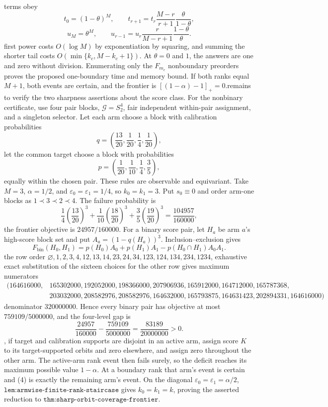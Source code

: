 terms obey\n\[t_0=(1-\theta)^M,\qquad t_{r+1}=t_r\frac{M-r}{r+1}\frac{\theta}{1-\theta},\tag{5}\]\n\[u_M=\theta^M,\qquad u_{r-1}=u_r\frac r{M-r+1}\frac{1-\theta}{\theta}.\tag{6}\]\nThe first power costs \(O(\log M)\) by exponentiation by squaring, and summing the shorter tail costs \(O(\min\{k_c,M-k_c+1\})\). At \(\theta=0\) and \(1\), the answers are one and zero without division. Enumerating only the \(F_{m_c}\) nonboundary preorders proves the proposed one-boundary time and memory bound. If both ranks equal \(M+1\), both events are certain, and the frontier is \([(1-\alpha)-1]_+=0\).\n\nIt remains to verify the two sharpness assertions about the score class. For the nonbinary certificate, use four pair blocks, \(\mathcal G=S_2^4\), fair independent within-pair assignment, and a singleton selector. Let each arm choose a block with calibration probabilities\n\[q=\left(\frac{13}{20},\frac1{20},\frac14,\frac1{20}\right),\]\nand let the common target choose a block with probabilities\n\[p=\left(\frac1{20},\frac1{10},\frac14,\frac35\right),\]\nsplitting equally within the chosen pair. These rules are observable and equivariant. Take \(M=3\), \(\alpha=1/2\), and \(\varepsilon_0=\varepsilon_1=1/4\), so \(k_0=k_1=3\). Put \(s_0\equiv0\) and order arm-one blocks as \(1\prec3\prec2\prec4\). The failure probability is\n\[\frac14\left(\frac{13}{20}\right)^3+\frac1{10}\left(\frac{18}{20}\right)^3+\frac35\left(\frac{19}{20}\right)^3=\frac{104957}{160000},\]\nso the frontier objective is \(24957/160000\). For a binary score pair, let \(H_a\) be arm \(a\)'s high-score block set and put \(A_a=(1-q(H_a))^3\). Inclusion--exclusion gives\n\[F_{\mathrm{bin}}(H_0,H_1)=p(H_0)A_0+p(H_1)A_1-p(H_0\cap H_1)A_0A_1.\tag{7}\]\nIn the row order \(\varnothing,1,2,3,4,12,13,14,23,24,34,123,124,134,234,1234\), exhaustive exact substitution of the sixteen choices for the other row gives maximum numerators\n\[\begin{split}(164616000,&165302000,192052000,198366000,207906936,165912000,164712000,165787368,\\&203032000,208582976,208582976,164632000,165793875,164631423,202894331,164616000)\end{split}\]\nover denominator \(320000000\). Hence every binary pair has objective at most \(759109/5000000\), and the four-level gap is\n\[\frac{24957}{160000}-\frac{759109}{5000000}=\frac{83189}{20000000}>0.\tag{8}\]\nFinally, if target and calibration supports are disjoint in an active arm, assign score \(K\) to its target-supported orbits and zero elsewhere, and assign zero throughout the other arm. The active-arm rank event then fails surely, so the deficit reaches its maximum possible value \(1-\alpha\). At a boundary rank that arm's event is certain and (4) is exactly the remaining arm's event. On the diagonal \(\varepsilon_0=\varepsilon_1=\alpha/2\), \(\texttt{lem:armwise-finite-rank-staircase}\) gives \(k_0=k_1=k\), proving the asserted reduction to \(\texttt{thm:sharp-orbit-coverage-frontier}\).